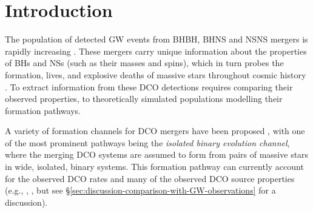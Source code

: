 \documentclass[fleqn,usenatbib]{mnras}
\begin{document}






\section{Introduction}
\label{sec:introduction}
%

The population of detected \ac{GW} events from \ac{BHBH}, \ac{BHNS} and \ac{NSNS} mergers is rapidly increasing \citep{2019PhRvX...9c1040A,2020LRR....21....3A,Abbott:GWTC-2,Abbott:2021GWTC3}.  
These mergers carry unique information about the properties of \acp{BH} and \acp{NS} (such as their masses and spins), which in turn probes the formation, lives, and explosive deaths of massive stars throughout cosmic history \citep[e.g.][]{Abbott:2021GWTC2pop,Abbott:2021GWTC3pop}. 
To extract information  from these  \ac{DCO} detections requires comparing their observed properties, to theoretically simulated populations modelling their formation pathways. 


A variety of formation channels for \ac{DCO} mergers have been proposed \citep[see][for  reviews]{MandelFarmer:2018,Mapelli:2021review}, with 
one of the most prominent pathways being the \emph{isolated binary evolution channel}, where the merging \ac{DCO} systems are assumed to form from pairs of massive stars in wide, isolated, binary systems. 
This formation pathway can currently account for the observed \ac{DCO} rates \citep[][]{MandelBroekgaardenReview:2021} and many of the observed \ac{DCO} source properties (e.g., \citealt[][]{VignaGomez:2018,Belczynski:2020bigBHpaper}, \citealt{BroekgaardenBerger2021}, but see \S\ref{sec:discussion-comparison-with-GW-observations} for a discussion).
\end{document}

